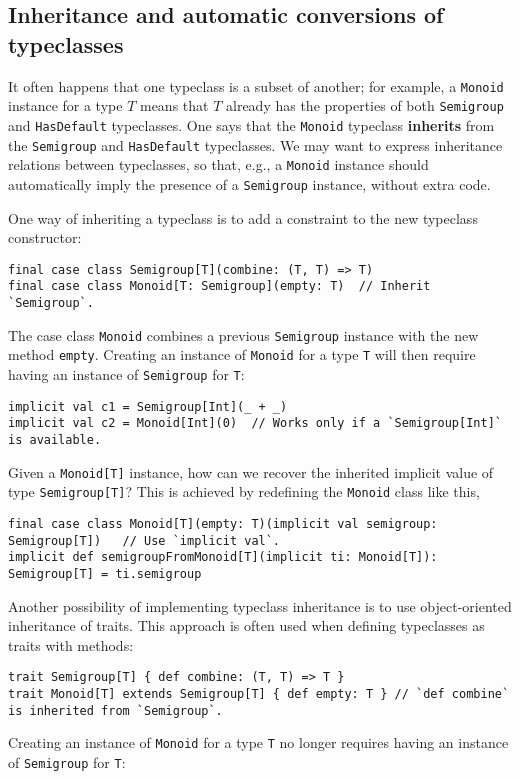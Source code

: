 \subsection{Inheritance and automatic conversions of typeclasses\label{subsec:Inheritance-and-automatic-typeclass}}

It often happens that one typeclass is a subset of another; for example,
a \lstinline!Monoid! instance for a type $T$ means that $T$ already
has the properties of both \lstinline!Semigroup! and \lstinline!HasDefault!
typeclasses. One says that the \lstinline!Monoid! typeclass \textbf{inherits}
from the \lstinline!Semigroup! and \lstinline!HasDefault! typeclasses.
We may want to express inheritance relations between typeclasses,
so that, e.g., a \lstinline!Monoid! instance should automatically
imply the presence of a \lstinline!Semigroup! instance, without extra
code.

One way of inheriting a typeclass is to add a constraint to the new
typeclass constructor:
\begin{lstlisting}
final case class Semigroup[T](combine: (T, T) => T)
final case class Monoid[T: Semigroup](empty: T)  // Inherit `Semigroup`.
\end{lstlisting}
The case class \lstinline!Monoid! combines a previous \lstinline!Semigroup!
instance with the new method \lstinline!empty!. Creating an instance
of \lstinline!Monoid! for a type \lstinline!T! will then require
having an instance of \lstinline!Semigroup! for \lstinline!T!:
\begin{lstlisting}
implicit val c1 = Semigroup[Int](_ + _)
implicit val c2 = Monoid[Int](0)  // Works only if a `Semigroup[Int]` is available.
\end{lstlisting}

Given a \lstinline!Monoid[T]! instance, how can we recover the inherited
implicit value of type \lstinline!Semigroup[T]!? This is achieved
by redefining the \lstinline!Monoid! class like this,
\begin{lstlisting}
final case class Monoid[T](empty: T)(implicit val semigroup: Semigroup[T])   // Use `implicit val`.
implicit def semigroupFromMonoid[T](implicit ti: Monoid[T]): Semigroup[T] = ti.semigroup
\end{lstlisting}

Another possibility of implementing typeclass inheritance is to use
object-oriented inheritance of traits. This approach is often used
when defining typeclasses as traits with methods:
\begin{lstlisting}
trait Semigroup[T] { def combine: (T, T) => T }
trait Monoid[T] extends Semigroup[T] { def empty: T } // `def combine` is inherited from `Semigroup`.
\end{lstlisting}
Creating an instance of \lstinline!Monoid! for a type \lstinline!T!
no longer requires having an instance of \lstinline!Semigroup! for
\lstinline!T!:

